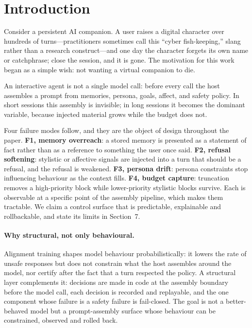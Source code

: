 \section{Introduction}\label{sec:intro}

Consider a persistent AI companion. A user raises a digital character over
hundreds of turns---practitioners sometimes call this ``cyber fish-keeping,''
slang rather than a research construct---and one day the character forgets its
own name or catchphrase; close the session, and it is gone. The motivation for
this work began as a simple wish: not wanting a virtual companion to die.

An interactive agent is not a single model call: before every call the host
assembles a prompt from memories, persona, goals, affect, and safety policy. In
short sessions this assembly is invisible; in long sessions it becomes the
dominant variable, because injected material grows while the budget does not.

Four failure modes follow, and they are the object of design throughout the
paper. \textbf{F1, memory overreach}: a stored memory is presented as a
statement of fact rather than as a reference to something the user once said.
\textbf{F2, refusal softening}: stylistic or affective signals are injected
into a turn that should be a refusal, and the refusal is weakened.
\textbf{F3, persona drift}: persona constraints stop influencing behaviour as
the context fills. \textbf{F4, budget capture}: truncation removes a
high-priority block while lower-priority stylistic blocks survive. Each is
observable at a specific point of the assembly pipeline, which makes them
tractable. We claim a control surface that is predictable, explainable and
rollbackable, and state its limits in Section~7.

\paragraph{Why structural, not only behavioural.} Alignment training shapes model
behaviour probabilistically: it lowers the rate of unsafe responses but does not
constrain what the host assembles around the model, nor certify after the fact
that a turn respected the policy. A structural layer complements it: decisions
are made in code at the assembly boundary before the model call, each decision is
recorded and replayable, and the one component whose failure is a safety failure
is fail-closed. The goal is not a better-behaved model but a prompt-assembly
surface whose behaviour can be constrained, observed and rolled back.

